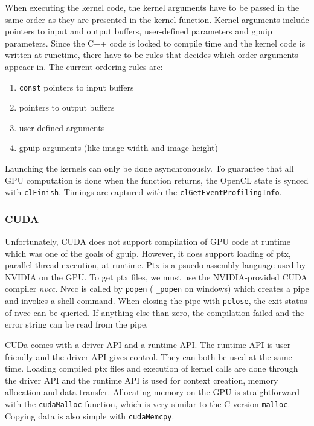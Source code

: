 When executing the kernel code, the kernel arguments have to be passed in the same order as they are presented in the kernel function. Kernel arguments include pointers to input and output buffers, user-defined parameters and gpuip parameters. Since the C++ code is locked to compile time and the kernel code is written at runetime,  there have to be rules that decides which order arguments appeaer in. The current ordering rules are:

\begin{enumerate}
\item {\tt const} pointers to input buffers
\item pointers to output buffers
\item user-defined arguments
\item gpuip-arguments (like image width and image height)
\end{enumerate}

Launching the kernels can only be done asynchronously. To guarantee that all GPU computation is done when the function returns, the OpenCL state is synced with {\tt clFinish}. Timings are captured with the {\tt clGetEventProfilingInfo}.

\subsubsection{CUDA}

Unfortunately, CUDA does not support compilation of GPU code at runtime which was one of the goals of gpuip. However, it does support loading of ptx, parallel thread execution, at runtime. Ptx is a psuedo-assembly language used by NVIDIA on the GPU. To get ptx files, we must use the NVIDIA-provided CUDA compiler \emph{nvcc}. Nvcc is called by {\tt popen} ( {\tt \_popen} on windows) which creates a pipe and invokes a shell command. When closing the pipe with {\tt pclose}, the exit status of nvcc can be queried. If anything else than zero, the compilation failed and the error string can be read from the pipe.
\newline

CUDa comes with a driver API and a runtime API. The runtime API is user-friendly and the driver API gives control. They can both be used at the same time. Loading compiled ptx files and execution of kernel calls are done through the driver API and the runtime API is used for context creation, memory allocation and data transfer. Allocating memory on the GPU is straightforward with the {\tt cudaMalloc} function, which is very similar to the C version {\tt malloc}. Copying data is also simple with {\tt cudaMemcpy}.
\newline


